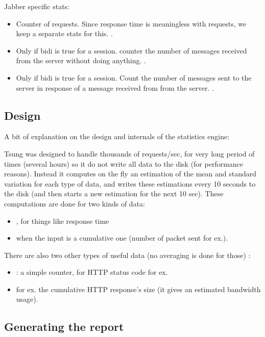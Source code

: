 \documentclass{TSUNG-en}
\begin{document}
Jabber specific stats:
\begin{itemize}
\item {} Counter of  requests. Since
  response time is meaningless with 
  requests, we keep a separate stats for this. .
\item {} Only if bidi is true for a
  session. counter the number of messages received from the server
  without doing anything.  .
\item {} Only if bidi is true for a
  session. Count the number of messages sent to the server in response
  of a message received from from the server. .
\end{itemize}

\subsection{Design}

A bit of explanation on the design and internals of the statistics engine:

Tsung was designed to handle thousands of requests/sec, for very
long period of times (several hours) so it do not write all data to
the disk (for performance reasons). Instead it computes on the fly an
estimation of the mean and standard variation for each type of data,
and writes these estimations every 10 seconds to the disk (and then
starts a new estimation for the next 10 sec). These computations are
done for two kinds of data:
\begin{itemize}
\item {}, for things like response time
\item {} when the input is a cumulative one (number of
packet sent for ex.).
\end{itemize}

There are also two other types of useful data (no averaging is done for
those) :
\begin{itemize}
\item {}: a simple counter, for HTTP status code for ex.
\item {} for ex. the cumulative HTTP response's size (it gives an
estimated bandwidth usage).
\end{itemize}



\subsection{Generating the report}
\end{document}
